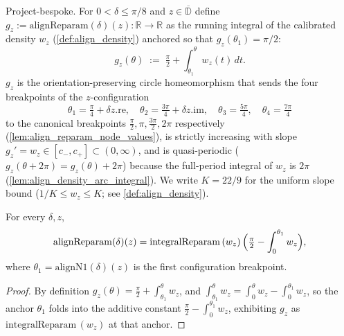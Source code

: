 \begin{definition}

  \label{def:align_reparam}
  Project-bespoke. For $0<\delta\le\pi/8$ and $z\in\overline{\mathbb{D}}$ define
  $g_z := \mathrm{alignReparam}(\delta)(z) : \mathbb{R}\to\mathbb{R}$ as the running
  integral of the calibrated density $w_z$ (\cref{def:align_density}) anchored so
  that $g_z(\theta_1)=\pi/2$:
  \[
    g_z(\theta) \;:=\; \tfrac{\pi}{2} + \int_{\theta_1}^{\theta} w_z(t)\,dt .
  \]
  $g_z$ is the orientation-preserving circle homeomorphism that sends the four
  breakpoints of the $z$-configuration
  \[
    \theta_1=\tfrac{\pi}{4}+\delta z.\mathrm{re},\quad
    \theta_2=\tfrac{3\pi}{4}+\delta z.\mathrm{im},\quad
    \theta_3=\tfrac{5\pi}{4},\quad
    \theta_4=\tfrac{7\pi}{4}
  \]
  to the canonical breakpoints $\tfrac{\pi}{2},\pi,\tfrac{3\pi}{2},2\pi$
  respectively (\cref{lem:align_reparam_node_values}), is strictly increasing with
  slope $g_z'=w_z\in[c_-,c_+]\subset(0,\infty)$, and is quasi-periodic
  ($g_z(\theta+2\pi)=g_z(\theta)+2\pi$) because the full-period integral of $w_z$ is
  $2\pi$ (\cref{lem:align_density_arc_integral}). We write $K=22/9$ for the uniform
  slope bound ($1/K\le w_z\le K$; see \cref{def:align_density}).
\end{definition}

\begin{lemma}

  \label{lem:align_reparam_eq}
  For every $\delta,z$,
  \[
    \mathrm{alignReparam}(\delta)(z)
      = \mathrm{integralReparam}\,(w_z)\,\Bigl(\tfrac\pi2-\int_0^{\theta_1} w_z\Bigr),
  \]
  where $\theta_1=\mathrm{alignN1}(\delta)(z)$ is the first configuration breakpoint.
\end{lemma}
\begin{proof}
  \leanok
  By definition $g_z(\theta)=\tfrac\pi2+\int_{\theta_1}^{\theta} w_z$, and
  $\int_{\theta_1}^{\theta} w_z = \int_0^{\theta} w_z - \int_0^{\theta_1} w_z$, so the
  anchor $\theta_1$ folds into the additive constant
  $\tfrac\pi2-\int_0^{\theta_1} w_z$, exhibiting $g_z$ as
  $\mathrm{integralReparam}\,(w_z)$ at that anchor.
\end{proof}

